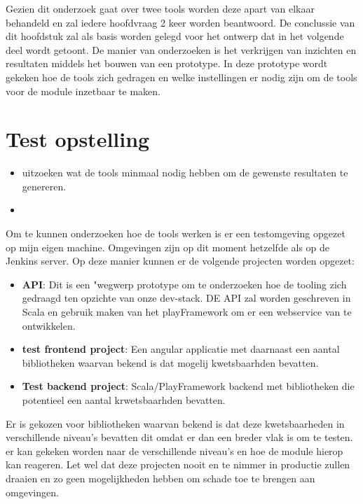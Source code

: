 Gezien dit onderzoek gaat over twee tools worden deze apart van elkaar behandeld en zal iedere hoofdvraag 2 keer worden beantwoord. De conclussie van dit hoofdstuk zal als basis worden gelegd voor het ontwerp dat in het volgende deel wordt getoont. De manier van onderzoeken is het verkrijgen van inzichten en resultaten middels het bouwen van een prototype. In deze prototype wordt gekeken hoe de tools zich gedragen en welke instellingen er nodig zijn om de tools voor de module inzetbaar te maken.

\section{Test opstelling}\label{sec:test-opstelling}
\begin{itemize}
    \item uitzoeken wat de tools  minmaal nodig hebben om de gewenste resultaten te genereren.
    \item
\end{itemize}



Om te kunnen onderzoeken hoe de tools werken is er een testomgeving opgezet op mijn eigen machine. Omgevingen zijn op dit moment hetzelfde als op de Jenkins server. Op deze manier kunnen er de volgende projecten worden opgezet:
\begin{itemize}
    \item \textbf{API}: Dit is een "wegwerp prototype om te onderzoeken hoe de tooling zich gedraagd ten opzichte van onze dev-stack. DE API zal worden geschreven in Scala en gebruik maken van het playFramework om er een webservice van te ontwikkelen.
    \item \textbf{test frontend project}: Een angular applicatie met daarnaast een aantal bibliotheken waarvan bekend is dat mogelij kwetsbaarhden bevatten.
    \item \textbf{Test backend project}: Scala/PlayFramework backend met bibliotheken die potentieel een aantal krwetsbaarhden bevatten.
\end{itemize}
Er is gekozen voor bibliotheken waarvan bekend is dat deze kwetsbaarheden in verschillende niveau's bevatten dit omdat er dan een breder vlak is om te testen. er kan gekeken worden naar de verschillende niveau's en hoe de module hierop kan reageren. Let wel dat deze projecten nooit en te nimmer in productie zullen draaien en zo geen mogelijkheden hebben om schade toe te brengen aan omgevingen.




